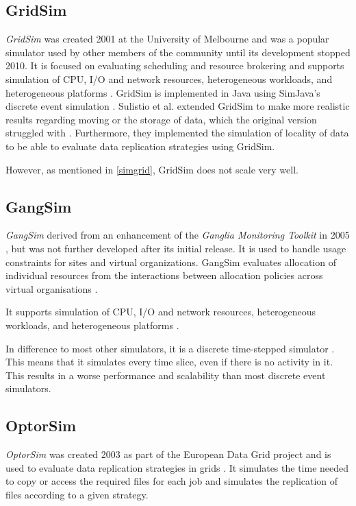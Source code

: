 \subsection{GridSim}
\label{gridsim}

\textit{GridSim} was created 2001 at the University of Melbourne and was a popular simulator used by other members of the community until its development stopped 2010.
It is focused on evaluating scheduling and resource brokering and supports simulation of CPU, I/O and network resources, heterogeneous workloads, and heterogeneous platforms \cite{gridsim}. GridSim is implemented in Java using SimJava's discrete event simulation \cite{gridsim}.
Sulistio et al. \cite{sulistio2008toolkit} extended GridSim to make more realistic results regarding moving or the storage of data, which the original version struggled with \cite{1698650}. Furthermore, they implemented the simulation of locality of data to be able to evaluate data replication strategies using GridSim.

However, as mentioned in \cref{simgrid}, GridSim does not scale very well.

\subsection{GangSim}

\textit{GangSim} derived from an enhancement of the \textit{Ganglia Monitoring Toolkit} in 2005 \cite{dumitrescu2005gangsim}, but was not further developed after its initial release.
It is used to handle usage constraints for sites and virtual organizations. GangSim evaluates allocation of individual resources from the interactions between allocation policies across virtual organisations \cite{dumitrescu2005gangsim}.

It supports simulation of CPU, I/O and network resources, heterogeneous workloads, and heterogeneous platforms \cite{dumitrescu2005gangsim}.

In difference to most other simulators, it is a discrete time-stepped simulator \cite{dgsim}. This means that it simulates every time slice, even if there is no activity in it. This results in a worse performance and scalability than most discrete event simulators.


\newpage
\subsection{OptorSim}
\textit{OptorSim} was created 2003 as part of the European Data Grid project and is used to evaluate data replication strategies in grids \cite{optorsim}. It simulates the time needed to copy or access the required files for each job and simulates the replication of files according to a given strategy.

